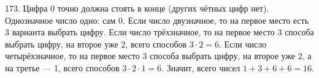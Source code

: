 173. Цифра 0 точно должна стоять в конце (других чётных цифр нет). Однозначное число одно: сам 0. Если число двузначное, то на первое место есть 3 варианта выбрать цифру. Если число трёхзначное, то на первое место 3 способа выбрать цифру, на второе уже 2, всего способов $3\cdot2=6.$ Если число четырёхзначное, то на первое место 3 способа выбрать цифру, на второе уже 2, а на третье --- 1, всего способов $3\cdot2\cdot1=6.$ Значит, всего чисел $1+3+6+6=16.$\\
